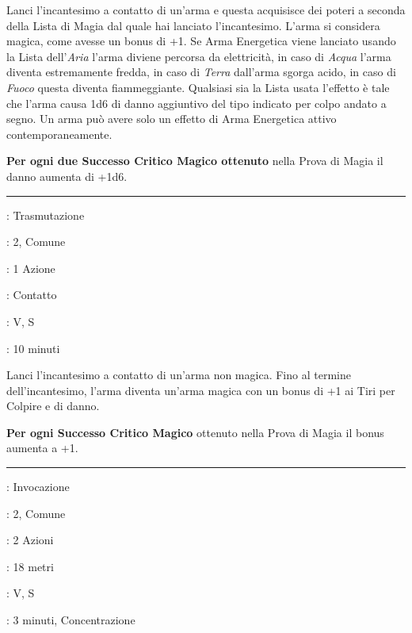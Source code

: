 \begin{multicols}{2}
Lanci l'incantesimo a contatto di un'arma e questa acquisisce dei poteri a seconda della Lista di Magia dal quale hai lanciato l'incantesimo. L'arma si considera magica, come avesse un bonus di +1.
Se Arma Energetica viene lanciato usando la Lista dell'\emph{Aria} l'arma diviene percorsa da elettricità, in caso di \emph{Acqua} l'arma diventa estremamente fredda, in caso di \emph{Terra} dall'arma sgorga acido, in caso di \emph{Fuoco} questa diventa fiammeggiante. Qualsiasi sia la Lista usata l'effetto è tale che l'arma causa 1d6 di danno aggiuntivo del tipo indicato per colpo andato a segno.
Un arma può avere solo un effetto di Arma Energetica attivo contemporaneamente.

\textbf{Per ogni due Successo Critico Magico ottenuto} nella Prova di Magia il danno aumenta di +1d6.

\smallskip\noindent\rule{\linewidth}{2pt} \hypertarget{Arma Magica}{}\smallskip{}
\noindent
\begin{description}[noitemsep, topsep=0pt, parsep=0pt, partopsep=0pt, leftmargin=0cm, labelwidth=2.8cm]
	\item[\textbf{Lista di Magia}]: Trasmutazione
	\item[\textbf{Livello}]: 2, Comune
	\item[\textbf{T. di Lancio}]: 1 Azione
	\item[\textbf{Gittata}]: Contatto
	\item[\textbf{Componenti}]: V, S
	\item[\textbf{Durata}]: 10 minuti
\end{description}

Lanci l'incantesimo a contatto di un'arma non magica. Fino al termine dell'incantesimo, l'arma diventa un'arma magica con un bonus di +1 ai Tiri per Colpire e di danno.

\textbf{Per ogni Successo Critico Magico} ottenuto nella Prova di Magia il bonus aumenta a +1.

\smallskip\noindent\rule{\linewidth}{2pt} \hypertarget{Arma Spirituale}{}\smallskip{}
\noindent
\begin{description}[noitemsep, topsep=0pt, parsep=0pt, partopsep=0pt, leftmargin=0cm, labelwidth=2.8cm]
	\item[\textbf{Lista di Magia}]: Invocazione
	\item[\textbf{Livello}]: 2, Comune
	\item[\textbf{T. di Lancio}]: 2 Azioni
	\item[\textbf{Gittata}]: 18 metri
	\item[\textbf{Componenti}]: V, S
	\item[\textbf{Durata}]: 3 minuti, Concentrazione
\end{description}


\end{multicols}
